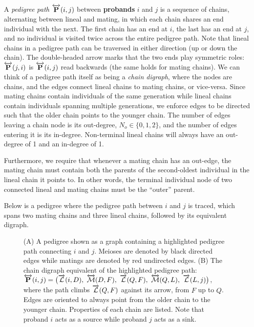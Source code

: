 \documentclass[12pt]{article}
\numberwithin{equation}{section}
\begin{document}
A \emph{pedigree path} $\overleftrightarrow{\mathbf{P}}(i,j)$ between \textbf{probands} $i$ and $j$ is a sequence of chains, alternating between lineal and mating, in which each chain shares an end individual with the next.
The first chain has an end at $i$, the last has an end at $j$, and no individual is visited twice across the entire pedigree path.
Note that lineal chains in a pedigree path can be traversed in either direction (up or down the chain).
The double-headed arrow marks that the two ends play symmetric roles: $\overleftrightarrow{\mathbf{P}}(j,i)$ is $\overleftrightarrow{\mathbf{P}}(i,j)$ read backwards (the same holds for mating chains).
We can think of a pedigree path itself as being a \emph{chain digraph}, where the nodes are chains, and the edges connect lineal chains to mating chains, or vice-versa.
Since mating chains contain individuals of the same generation while lineal chains contain individuals spanning multiple generations, we enforce edges to be directed such that the older chain points to the younger chain.
The number of edges leaving a chain node is its out-degree, $N_o \in \{0,1,2\}$, and the number of edges entering it is its in-degree.
Non-terminal lineal chains will always have an out-degree of 1 and an in-degree of 1.

Furthermore, we require that whenever a mating chain has an out-edge, the mating chain must contain both the parents of the second-oldest individual in the lineal chain it points to.
In other words, the terminal individual node of two connected lineal and mating chains must be the ``outer'' parent.

Below is a pedigree where the pedigree path between $i$ and $j$ is traced, which spans two mating chains and three lineal chains, followed by its equivalent digraph.

\begin{figure}[H]
    \begin{floatcard}
        

        \vspace{1.0em}
        
        \caption{%
            (A) A pedigree shown as a graph containing a highlighted pedigree path connecting $i$ and $j$.
            Meioses are denoted by black directed edges while matings are denoted by red undirected edges.
            (B) The chain digraph equivalent of the highlighted pedigree path:
            $\PedPath(i,j) =\big(\Lin(i,D),\ \Mu(D,F),\ \Lin(Q,F),\ \Mu(Q,L),\ \Lin(L,j)\big)$,
            where the path climbs $\overrightarrow{\mathcal{L}}(Q,F)$ against its arrow, from $F$ up to $Q$.
            Edges are oriented to always point from the older chain to the younger chain.
            Properties of each chain are listed.
            Note that proband $i$ acts as a source while proband $j$ acts as a sink.
        }
        \label{fig:path-example}
    \end{floatcard}
\end{figure}
\end{document}

